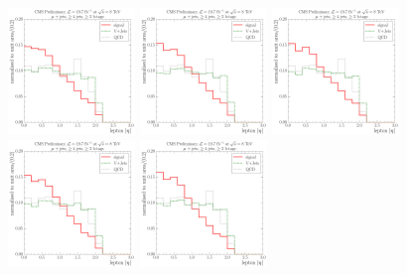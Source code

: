 \begin{figure}[!htbp]
	\centering
  	{\includegraphics[width=0.3\textwidth]{measurement/HT/central/fit_templates/muon_templates_bin_0-240}}
  	{\includegraphics[width=0.3\textwidth]{measurement/HT/central/fit_templates/muon_templates_bin_240-280}}
  	{\includegraphics[width=0.3\textwidth]{measurement/HT/central/fit_templates/muon_templates_bin_280-330}}\\
  	{\includegraphics[width=0.3\textwidth]{measurement/HT/central/fit_templates/muon_templates_bin_330-380}}
  	{\includegraphics[width=0.3\textwidth]{measurement/HT/central/fit_templates/muon_templates_bin_380-450}}

\end{figure}
